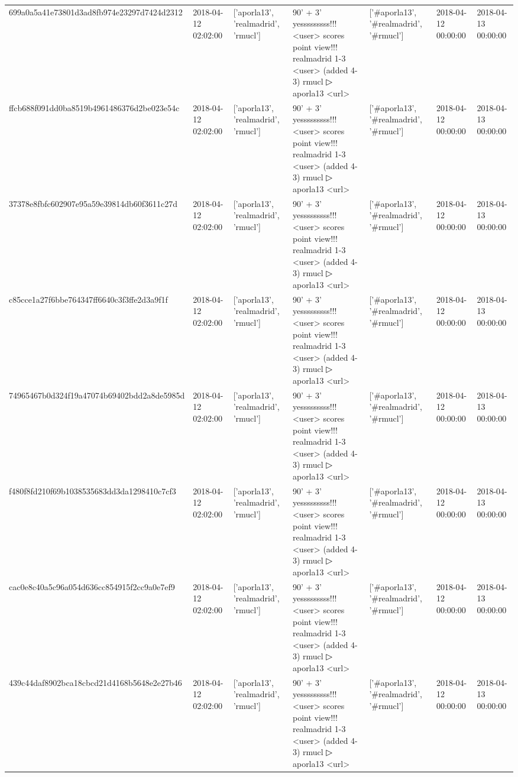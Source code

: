\begin{tabular}{lllllll}
699a0a5a41e73801d3ad8fb974e23297d7424d2312 & 2018-04-12 02:02:00 & ['aporla13', 'realmadrid', 'rmucl'] & 90' + 3' yesssssssss!!! <user> scores point view!!! realmadrid 1-3 <user> (added 4-3) rmucl ▷ aporla13 <url> & ['#aporla13', '#realmadrid', '#rmucl'] & 2018-04-12 00:00:00 & 2018-04-13 00:00:00 \\
ffcb688f091dd0ba8519b4961486376d2be023e54c & 2018-04-12 02:02:00 & ['aporla13', 'realmadrid', 'rmucl'] & 90' + 3' yesssssssss!!! <user> scores point view!!! realmadrid 1-3 <user> (added 4-3) rmucl ▷ aporla13 <url> & ['#aporla13', '#realmadrid', '#rmucl'] & 2018-04-12 00:00:00 & 2018-04-13 00:00:00 \\
37378e8fbfc602907e95a59e39814db60f3611c27d & 2018-04-12 02:02:00 & ['aporla13', 'realmadrid', 'rmucl'] & 90' + 3' yesssssssss!!! <user> scores point view!!! realmadrid 1-3 <user> (added 4-3) rmucl ▷ aporla13 <url> & ['#aporla13', '#realmadrid', '#rmucl'] & 2018-04-12 00:00:00 & 2018-04-13 00:00:00 \\
c85cce1a27f6bbe764347ff6640c3f3ffe2d3a9f1f & 2018-04-12 02:02:00 & ['aporla13', 'realmadrid', 'rmucl'] & 90' + 3' yesssssssss!!! <user> scores point view!!! realmadrid 1-3 <user> (added 4-3) rmucl ▷ aporla13 <url> & ['#aporla13', '#realmadrid', '#rmucl'] & 2018-04-12 00:00:00 & 2018-04-13 00:00:00 \\
74965467b0d324f19a47074b69402bdd2a8de5985d & 2018-04-12 02:02:00 & ['aporla13', 'realmadrid', 'rmucl'] & 90' + 3' yesssssssss!!! <user> scores point view!!! realmadrid 1-3 <user> (added 4-3) rmucl ▷ aporla13 <url> & ['#aporla13', '#realmadrid', '#rmucl'] & 2018-04-12 00:00:00 & 2018-04-13 00:00:00 \\
f480f8fd210f69b1038535683dd3da1298410c7cf3 & 2018-04-12 02:02:00 & ['aporla13', 'realmadrid', 'rmucl'] & 90' + 3' yesssssssss!!! <user> scores point view!!! realmadrid 1-3 <user> (added 4-3) rmucl ▷ aporla13 <url> & ['#aporla13', '#realmadrid', '#rmucl'] & 2018-04-12 00:00:00 & 2018-04-13 00:00:00 \\
cac0e8c40a5c96a054d636cc854915f2cc9a0e7ef9 & 2018-04-12 02:02:00 & ['aporla13', 'realmadrid', 'rmucl'] & 90' + 3' yesssssssss!!! <user> scores point view!!! realmadrid 1-3 <user> (added 4-3) rmucl ▷ aporla13 <url> & ['#aporla13', '#realmadrid', '#rmucl'] & 2018-04-12 00:00:00 & 2018-04-13 00:00:00 \\
439c44daf8902bca18cbcd21d4168b5648e2e27b46 & 2018-04-12 02:02:00 & ['aporla13', 'realmadrid', 'rmucl'] & 90' + 3' yesssssssss!!! <user> scores point view!!! realmadrid 1-3 <user> (added 4-3) rmucl ▷ aporla13 <url> & ['#aporla13', '#realmadrid', '#rmucl'] & 2018-04-12 00:00:00 & 2018-04-13 00:00:00 \\

\end{tabular}
